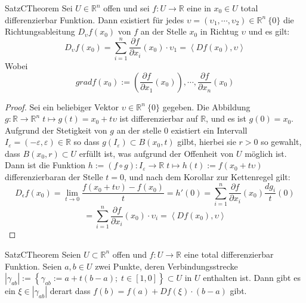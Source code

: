 \begin{ibox}[36]{Satz}{CTheorem}
    Sei $ U \in \mathbb{R}^n  $ offen und sei $ f: U \to \mathbb{R}  $ eine in $ x_0 \in U $ total differenzierbar
	Funktion. Dann existiert für jedes $ \upsilon =  \left( \upsilon_1 , \cdots, \upsilon_2 \right) \in \mathbb{R}^n \ \{0\} $ 
	die Richtungsableitung $ D_{\upsilon}f(x_0) $ von $ f $ an der Stelle $ x_0 $ in Richtug $ \upsilon$ und es gilt:
	$$ D_{\upsilon}f(x_0) = \sum_{i=1}^{n} \frac{\partial f}{\partial x_{i}} (x_0) \cdot \upsilon_1  =
	\left<Df(x_0), \upsilon \right>$$
	Wobei
	$$ grad f(x_0) := \left( \frac{\partial f}{\partial x_1} (x_0) \right) , \cdots, \frac{\partial f}{\partial x_n} (x_0) $$
\end{ibox}
\begin{proof}
	Sei ein beliebiger Vektor $ \upsilon \in \mathbb{R}^n \ \{0\} $ gegeben. Die Abbildung $ g: \mathbb{R}  \to \mathbb{R}^n 
	 \; t \mapsto g(t) = x_0 + t \upsilon$  ist differenzierbar auf $ \mathbb{R}  $, und es ist $ g(0) = x_0 $. 
	 Aufgrund der Stetigkeit von $ g $ an der stelle $ 0 $ existiert ein Intervall $ I_{\varepsilon} = \left( - \varepsilon 
	 , \varepsilon \right) \in \mathbb{R}  $ so dass $ g \left( I_{ \varepsilon } \right) \subset  B(x_0,t) $ gilbt, hierbei
	 sie $ r > 0 $ so gewahlt, dass $ B(x_0, r) \subset U $ erfüllt ist, was aufgrund der Offenheit von $ U $ möglich ist.
	 Dann ist die Funktion $ h:=(f \circ g): I_{ \varepsilon } \to \mathbb{R} \; t \mapsto h(t) := f(x_0+t \upsilon) $ 
	 differenzierbaran der Stelle $ t = 0 $, und nach dem Korollar zur Kettenregel gilt:
	 $$ D_{\epsilon}f(x_0) = \lim_{t \to 0} \frac{f(x_0+t \upsilon) - f(x_0)}{t} = h'(0) = 
	 \sum_{i = 1}^{n} \frac{\partial f}{\partial x_{i}} (x_0) \frac{dg_{i}}{t}(0) 
	 $$
	  $$ = \sum_{i=1}^{n} \frac{\partial f}{\partial x_{i}} (x_0) \cdot \upsilon_{i} = \left<Df(x_0), \upsilon \right> $$
	   
\end{proof}
\begin{ibox}[37]{Satz}{CTheorem}
    Seien $ U \subset  \mathbb{R}^n  $ offen und $ f: U \to \mathbb{R}  $ eine total differenzierbar Funktion. Seien $ a,b \in U $
	zwei Punkte, deren Verbindungsstrecke $ \left| \gamma_{ab} \right| := \left\{ \gamma_{ab} := a + t(b-a); \; 
	t \in [1,0] \right\} \subset  U \text{ in } U $ enthalten ist. Dann gibt es ein $ \xi \in \left| \gamma_{ab} \right|  $ 
	derart dass $ f(b) = f(a)+ Df(\xi) \cdot (b-a)  $ gibt.
\end{ibox}

